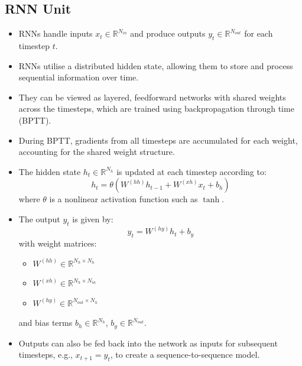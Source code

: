 \subsection{RNN Unit}
\begin{itemize}
    \item RNNs handle inputs $x_t \in \mathbb{R}^{N_{in}}$ and produce outputs $y_t \in \mathbb{R}^{N_{out}}$ for each timestep $t$.
    \item RNNs utilise a distributed hidden state, allowing them to store and process sequential information over time.
    \item They can be viewed as layered, feedforward networks with shared weights across the timesteps, which are trained using backpropagation through time (BPTT).
    \item During BPTT, gradients from all timesteps are accumulated for each weight, accounting for the shared weight structure.
    \item The hidden state $h_t \in \mathbb{R}^{N_h}$ is updated at each timestep according to:
    \begin{equation}
    h_t = \theta(W^{(hh)} h_{t-1} + W^{(xh)} x_t + b_h)
    \end{equation}
    where $\theta$ is a nonlinear activation function such as $\tanh$.
    \item The output $y_t$ is given by:
    \begin{equation}
    y_t = W^{(hy)} h_t + b_y
    \end{equation}
    with weight matrices:
    \begin{itemize}
        \item $W^{(hh)} \in \mathbb{R}^{N_h \times N_h}$
        \item $W^{(xh)} \in \mathbb{R}^{N_h \times N_{in}}$
        \item $W^{(hy)} \in \mathbb{R}^{N_{out} \times N_h}$
    \end{itemize}  and bias terms $b_h \in \mathbb{R}^{N_h}$, $b_y \in \mathbb{R}^{N_{out}}$.
    \item Outputs can also be fed back into the network as inputs for subsequent timesteps, e.g., $x_{t+1} = y_t$, to create a sequence-to-sequence model.
\end{itemize}

